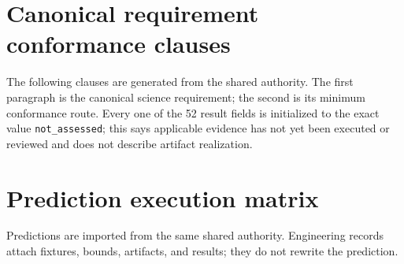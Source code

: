 \documentclass[10pt]{article}
\newcommand{\MaybeRequirementBreak}[1]{%
  \ifcsname SCIMapRequirementBreak#1\endcsname
    \csname SCIMapRequirementBreak#1\endcsname
  \fi}
\begin{document}
\SCIMapNOIOwnershipStatement

\clearpage
\section{Canonical requirement conformance clauses}\label{sec:requirements}

The following clauses are generated from the shared authority. The first
paragraph is the canonical science requirement; the second is its minimum
conformance route. Every one of the 52 result fields is initialized to the
exact value \texttt{not\_assessed}; this says applicable evidence has not yet
been executed or reviewed and does not describe artifact realization.

\renewcommand{\SCIMapRequirement}[4]{%
  \MaybeRequirementBreak{#1}%
  \phantomsection\label{engreq:#1}%
  \noindent\textbf{\textcolor{EngNavy}{#1} -- #2}\par\nobreak
  \textbf{Canonical clause:} #3\par
  \textbf{Minimum conformance evidence:} #4\par
  \textbf{Result:} \textcolor{EngGray}{\texttt{not\_assessed}}\par
  \smallskip\hrule\smallskip}
\begin{sloppypar}\small
\SCIMapRequirements
\end{sloppypar}\normalsize

\clearpage
\section{Prediction execution matrix}\label{sec:predictions}

Predictions are imported from the same shared authority. Engineering records
attach fixtures, bounds, artifacts, and results; they do not rewrite the
prediction.

\renewcommand{\SCIMapPrediction}[4]{%
  \par\begin{minipage}{\linewidth}%
  \phantomsection\label{engpred:#1}%
  \noindent\textbf{\textcolor{EngNavy}{#1} -- #2}\par
  \textbf{Canonical prediction:} #3\par
  \textbf{Primary claim layer:} #4.\par
  \textbf{Fixture / bound / result:} \textcolor{EngGray}{\texttt{not\_assessed}; preregistration pending}\par
  \smallskip\hrule
  \end{minipage}\par\smallskip}
\SCIMapPredictions
\end{document}
